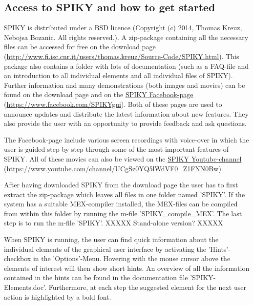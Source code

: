 \documentclass[10pt,twocolumn]{elsart5p}
\begin{document}
\subsection{\label{ss:Access} Access to SPIKY and how to get started}

SPIKY is distributed under a BSD licence (Copyright (c) 2014, Thomas Kreuz, Nebojsa Bozanic. All rights reserved.). A zip-package containing all the necessary files can be accessed for free on the \href{http://www.fi.isc.cnr.it/users/thomas.kreuz/Source-Code/SPIKY.html}{download page} (\url{http://www.fi.isc.cnr.it/users/thomas.kreuz/Source-Code/SPIKY.html}). This package also contains a folder with lots of documentation (such as a FAQ-file and an introduction to all individual elements and all individual files of SPIKY). Further information and many demonstrations (both images and movies) can be found on the download page and on the \href{https://www.facebook.com/SPIKYgui}{SPIKY Facebook-page} (\url{https://www.facebook.com/SPIKYgui}). Both of these pages are used to announce updates and distribute the latest information about new features. They also provide the user with an opportunity to provide feedback and ask questions.

The Facebook-page include various screen recordings with voice-over in which the user is guided step by step through some of the most important features of SPIKY. All of these movies can also be viewed on the \href{https://www.youtube.com/channel/UCgSz0YQ5lWdVF0_Z1FNN0Bw}{SPIKY Youtube-channel} (\url{https://www.youtube.com/channel/UCgSz0YQ5lWdVF0_Z1FNN0Bw}).

After having downloaded SPIKY from the download page the user has to first extract the zip-package which leaves all files in one folder named 'SPIKY'. If the system has a suitable MEX-compiler installed, the MEX-files can be compiled from within this folder by running the m-file 'SPIKY\_compile\_MEX'. The last step is to run the m-file 'SPIKY'. XXXXX Stand-alone version? XXXXX 

When SPIKY is running, the user can find quick information about the individual elements of the graphical user interface by activating the 'Hints'-checkbox in the 'Options'-Menu. Hovering with the mouse cursor above the elements of interest will then show short hints. An overview of all the information contained in the hints can be found in the documentation file 'SPIKY-Elements.doc'. Furthermore, at each step the suggested element for the next user action is highlighted by a bold font. 
\end{document}

